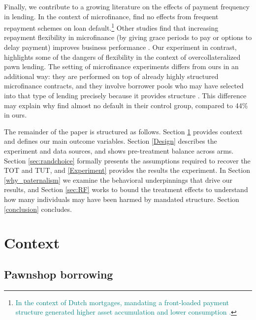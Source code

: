 \documentclass[12pt, a4paper, colorinlistoftodos]{article}
\begin{document}
Finally, we contribute to a growing literature on the effects of payment frequency in lending. In the context of microfinance, \citep{Pande} find no effects from frequent repayment schemes on loan default.\footnote{\textcolor{teal}{In the context of Dutch mortgages, mandating a front-loaded payment structure generated higher asset accumulation and lower consumption \cite{BernsteinKoudijs2024}.}} Other studies find that increasing repayment flexibility in microfinance (by giving grace periods to pay or options to delay payment) improves business performance \citep{Field,barboni2023flexible,flexibilty2024}. Our experiment in contrast, highlights some of the dangers of flexibility in the context of overcollateralized pawn lending. The setting of microfinance experiments differs from ours in an additional way: they are performed on top of already highly structured microfinance contracts, and they involve borrower pools who may have selected into that type of lending precisely because it provides structure \citep{bauer2012behavioral}. This difference may explain why \cite{Pande} find almost no default in their control group, compared to 44\% in ours. 



The remainder of the paper is structured as follows. Section \ref{context} provides context and defines our main outcome variables. Section \ref{Design} describes the experiment and data sources, and shows pre-treatment balance across arms. Section \ref{sec:randchoice} formally presents the assumptions required to recover the TOT and TUT, and  \ref{Experiment} provides the results the experiment.  In Section \ref{why_paternalism} we examine the behavioral underpinnings that drive our results, and Section \ref{sec:RF} works to bound the treatment effects to understand how many individuals may have been harmed by mandated structure.   Section \ref{conclusion} concludes.


\section{Context} \label{context}

\subsection{Pawnshop borrowing}
    
\end{document}
